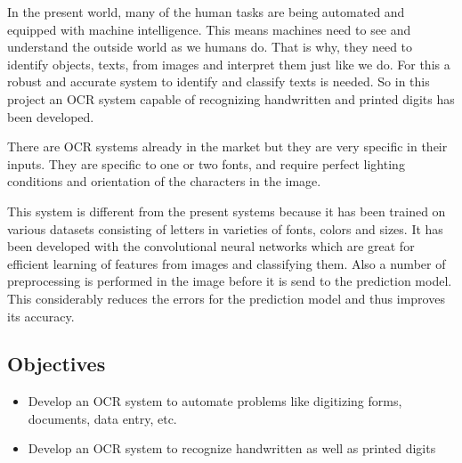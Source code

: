 In the present world, many of the human tasks are being automated and equipped with machine intelligence. This means machines need to see and understand the outside world as we humans do. That is why, they need to identify objects, texts, from images and interpret them just like we do. For this a robust and accurate system to identify and classify texts is needed. So in this project an OCR system capable of recognizing handwritten and printed digits has been developed. 

There are OCR systems already in the market but they are very specific in their inputs. They are specific to one or two fonts, and require perfect lighting conditions and orientation of the characters in the image.

This system is different from the present systems because it has been trained on various datasets consisting of letters in varieties of fonts, colors and sizes. It has been developed with the convolutional neural networks which are great for efficient learning of features from images and classifying them. Also a number of preprocessing is performed in the image before it is send to the prediction model. This considerably reduces the errors for the prediction model and thus improves its accuracy.

\subsection{Objectives}
\begin{itemize}
\item Develop an OCR system to automate problems like digitizing forms, documents, data entry, etc.
\item Develop an OCR system to recognize handwritten as well as printed digits
\end{itemize}

